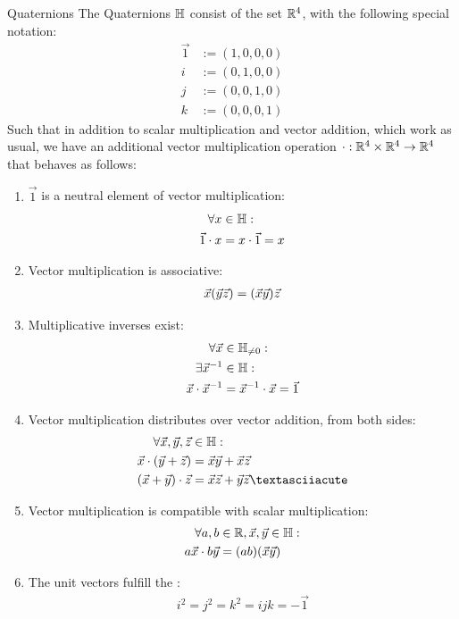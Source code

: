 \begin{importantdefinition}{Quaternions}{}
	The Quaternions $\mathbb{H}$ consist of the set $\mathbb{R}^4$, with the following special notation:
	\begin{align*}
		\vec 1 &:= (1,0,0,0)\\
		i &:= (0,1,0,0)\\
		j &:= (0,0,1,0)\\
		k &:= (0,0,0,1)
	\end{align*}
	Such that in addition to scalar multiplication and vector addition, which work as usual, we have an additional vector multiplication operation $\cdot : \mathbb{R}^4 \times \mathbb{R}^4 \to \mathbb{R}^4$ that behaves as follows:
	\begin{enumerate}
		\item $\vec 1$ is a neutral element of vector multiplication: 
		\begin{align*}
			\forall x &\in \mathbb{H}:\\ 
			\vec 1 \cdot x &= x \cdot \vec 1 = x
		\end{align*}
		\item Vector multiplication is associative:
		\begin{align*}
			\vec{x}(\vec{y}\vec{z}) = (\vec{x}\vec{y})\vec{z}
		\end{align*}
		\item Multiplicative inverses exist:
		\begin{align*}
			\forall \vec{x} &\in \mathbb{H}_{\neq 0}:\\
			\exists \vec{x}^{-1} &\in \mathbb{H}:\\
			\vec{x} \cdot \vec{x}^{-1} &= \vec{x}^{-1} \cdot \vec{x} = \vec 1
		\end{align*}
		\item Vector multiplication distributes over vector addition, from both sides:
		\begin{align*}
			\forall \vx, \vy, \vz &\in \bH:\\ 
			\vx \cdot (\vy + \vz) &= \vx  \vy + \vx \vz\\
			(\vx + \vy) \cdot \vz &= \vx \vz + \vy \vz´
		\end{align*}
		\item Vector multiplication is compatible with scalar multiplication:
		\begin{align*}
			\forall a,b &\in \mathbb{R},
					\vec{x},\vec{y} \in \mathbb{H}:\\
			a\vec{x} \cdot b\vec{y} &= (ab)(\vec{x}\vec{y})
		\end{align*}
		\item The unit vectors fulfill the :
		\begin{align*}
			i^2 = j^2 = k^2 = ijk = -\vec 1
		\end{align*}
	\end{enumerate}
\end{importantdefinition}
